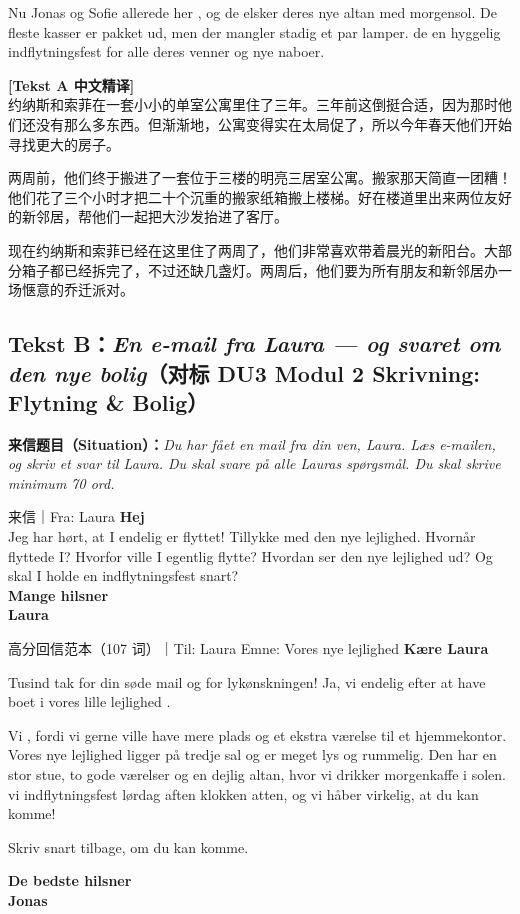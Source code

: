 Nu  Jonas og Sofie allerede  her , og de elsker deres nye altan med morgensol. De fleste kasser er pakket ud, men der mangler stadig et par lamper.   de en hyggelig indflytningsfest for alle deres venner og nye naboer.

\begin{transbox}
\small
\textbf{\color{NCDTeal}[Tekst A 中文精译]}\\
约纳斯和索菲在一套小小的单室公寓里住了三年。三年前这倒挺合适，因为那时他们还没有那么多东西。但渐渐地，公寓变得实在太局促了，所以今年春天他们开始寻找更大的房子。

两周前，他们终于搬进了一套位于三楼的明亮三居室公寓。搬家那天简直一团糟！他们花了三个小时才把二十个沉重的搬家纸箱搬上楼梯。好在楼道里出来两位友好的新邻居，帮他们一起把大沙发抬进了客厅。

现在约纳斯和索菲已经在这里住了两周了，他们非常喜欢带着晨光的新阳台。大部分箱子都已经拆完了，不过还缺几盏灯。两周后，他们要为所有朋友和新邻居办一场惬意的乔迁派对。
\end{transbox}

\subsection*{Tekst B：\textit{En e-mail fra Laura --- og svaret om den nye bolig}（对标 DU3 Modul 2 Skrivning: Flytning \& Bolig）}

\textbf{来信题目（Situation）：}\textit{Du har fået en mail fra din ven, Laura. Læs e-mailen, og skriv et svar til Laura. Du skal svare på alle Lauras spørgsmål. Du skal skrive minimum 70 ord.}

\begin{emailbox}{来信｜Fra: Laura}
\textbf{Hej}\\
Jeg har hørt, at I endelig er flyttet! Tillykke med den nye lejlighed. Hvornår flyttede I? Hvorfor ville I egentlig flytte? Hvordan ser den nye lejlighed ud? Og skal I holde en indflytningsfest snart?\\
\textbf{Mange hilsner}\\
\textbf{Laura}
\end{emailbox}

\begin{emailbox}{高分回信范本（107 词）｜Til: Laura \quad Emne: Vores nye lejlighed}
\textbf{Kære Laura}

Tusind tak for din søde mail og for lykønskningen! Ja, vi  endelig  efter at have boet i vores lille lejlighed .

Vi  , fordi vi gerne ville have mere plads og et ekstra værelse til et hjemmekontor. Vores nye lejlighed ligger på tredje sal og er meget lys og rummelig. Den har en stor stue, to gode værelser og en dejlig altan, hvor vi drikker morgenkaffe i solen.   vi indflytningsfest lørdag aften klokken atten, og vi håber virkelig, at du kan komme!

Skriv snart tilbage, om du kan komme.

\textbf{De bedste hilsner}\\
\textbf{Jonas}
\end{emailbox}

